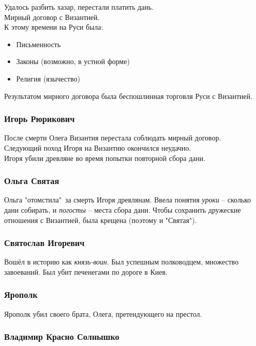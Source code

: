 Удалось разбить хазар, перестали платить дань. \\
Мирный договор с Византией. \\
К этому времени на Руси была:
\begin{itemize}
  \item Письменность
  \item Законы (возможно, в устной форме)
  \item Религия (язычество)
\end{itemize}

Результатом мирного договора была беспошлинная торговля Руси с Византией.

\subsubsection*{Игорь Рюрикович}

После смерти Олега Византия перестала соблюдать мирный договор. \\
Следующий поход Игоря на Византию окончился неудачно. \\
Игоря убили древляне во время попытки повторной сбора дани.

\subsubsection*{Ольга Святая}

Ольга "отомстила"\ за смерть Игоря древлянам.
Ввела понятия \textit{уроки} -- сколько дани собирать, и \textit{погосты} -- места сбора дани. 
Чтобы сохранить дружеские отношения с Византией, была крещена (поэтому и "Святая").

\subsubsection*{Святослав Игоревич}

Вошёл в историю как \textit{князь-воин}. Был успешным полководцем, множество завоеваний. Был убит печенегами по дороге в Киев.

\subsubsection*{Ярополк}

Ярополк убил своего брата, Олега, претендующего на престол.

\subsubsection*{Владимир Красно Солнышко}

